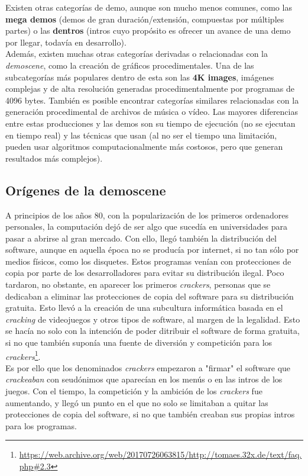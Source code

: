 Existen otras categorías de demo, aunque son mucho menos comunes, como las \textbf{mega demos} (demos de gran duración/extensión, compuestas por múltiples partes) o las \textbf{dentros} (intros cuyo propósito es ofrecer un avance de una demo por llegar, todavía en desarrollo).\\

Además, existen muchas otras categorías derivadas o relacionadas con la \emph{demoscene}, como la creación de gráficos procedimentales. Una de las subcategorías más populares dentro de esta son las \textbf{4K images}, imágenes complejas y de alta resolución generadas procedimentalmente por programas de 4096 bytes. También es posible encontrar categorías similares relacionadas con la generación procedimental de archivos de música o vídeo. Las mayores diferencias entre estas producciones y las demos son su tiempo de ejecución (no se ejecutan en tiempo real) y las técnicas que usan (al no ser el tiempo una limitación, pueden usar algoritmos computacionalmente más costosos, pero que generan resultados más complejos).

\subsection{Orígenes de la demoscene}

A principios de los años 80, con la popularización de los primeros ordenadores personales, la computación dejó de ser algo que sucedía en universidades para pasar a abrirse al gran mercado. Con ello, llegó también la distribución del software, aunque en aquella época no se producía por internet, si no tan sólo por medios físicos, como los disquetes. Estos programas venían con protecciones de copia por parte de los desarrolladores para evitar su distribución ilegal. Poco tardaron, no obstante, en aparecer los primeros \emph{crackers}, personas que se dedicaban a eliminar las protecciones de copia del software para su distribución gratuita. Esto llevó a la creación de una subcultura informática basada en el \emph{cracking} de videojuegos y otros tipos de software, al margen de la legalidad. Esto se hacía no solo con la intención de poder ditribuir el software de forma gratuita, si no que también suponía una fuente de diversión y competición para los \emph{crackers}\footnote{\url{https://web.archive.org/web/20170726063815/http://tomaes.32x.de/text/faq.php\#2.3}}.\\

Es por ello que los denominados \emph{crackers} empezaron a "firmar" el software que \emph{crackeaban} con seudónimos que aparecían en los menús o en las intros de los juegos. Con el tiempo, la competición y la ambición de los \emph{crackers} fue aumentando, y llegó un punto en el que no solo se limitaban a quitar las protecciones de copia del software, si no que también creaban sus propias intros para los programas.\\

